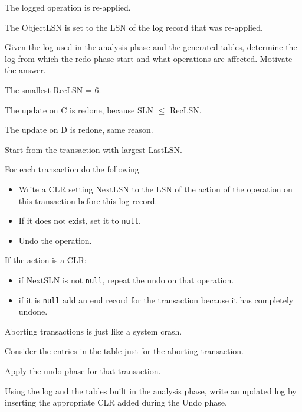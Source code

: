 \documentclass{beamer}
\begin{document}
\begin{slide}{
	\item The logged operation is re-applied.
	\item The ObjectLSN is set to the LSN of the log record that was re-applied.
}\end{slide}

\begin{slide}{
	\item Given the log used in the analysis phase and the generated tables, determine the log from which the redo phase start and what operations are affected. Motivate the answer.
		
	\vspace{1cm}
	\item The smallest RecLSN = 6.
	\item The update on C is redone, because SLN $\leq$ RecLSN.
	\item The update on D is redone, same reason.	
}\end{slide}

\begin{slide}{
	\item Start from the transaction with largest LastLSN.
	\item For each transaction do the following
	\begin{itemize}
		\item Write a CLR setting NextLSN to the LSN of the action of the operation on this transaction before this log record.
		\item If it does not exist, set it to \texttt{null}.
		\item Undo the operation.
	\end{itemize} 
	\item If the action is a CLR:
		\begin{itemize}
			\item if NextSLN is not \texttt{null}, repeat the undo on that operation.
			\item if it is \texttt{null} add an end record for the transaction because it has completely undone.
		\end{itemize}
}\end{slide}

\begin{slide}{
	\item Aborting transactions is just like a system crash.
	\item Consider the entries in the table just for the aborting transaction.
	\item Apply the undo phase for that transaction.
}\end{slide}

\begin{slide}{
	\item Using the log and the tables built in the analysis phase, write an updated log by inserting the appropriate CLR added during the Undo phase.
}\end{slide}
\end{document}
